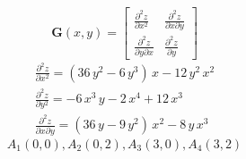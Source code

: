 \documentclass[../rgr1.tex]{subfiles}
\begin{document}
\begin{equation}
	\mathbf{G}(x,y) =
	\begin{bmatrix}
		\frac{\partial^2 z}{\partial x^2} & \frac{\partial^2 z}{\partial x\partial y} \\
		\frac{\partial^2 z}{\partial y\partial x} & \frac{\partial^2 z}{\partial y}
	\end{bmatrix}
\end{equation}
\begin{align}
	\frac{\partial^2 z}{\partial x^2}
	= \left(36\,{y}^{2}-6\,{y}^{3}\right)\,x-12\,{y}^{2}\,{x}^{2} \\
	\frac{\partial^2 z}{\partial y^2}
	= -6\,{x}^{3}\,y-2\,{x}^{4}+12\,{x}^{3} \\
	\frac{\partial^2 z}{\partial x\partial y} =
	\left(36\,y-9\,{y}^{2}\right)\,{x}^{2}-8\,y\,{x}^{3}
\end{align}
$$
A_1(0,0), A_2(0,2), A_3(3,0), A_4(3,2)
$$
\end{document}
